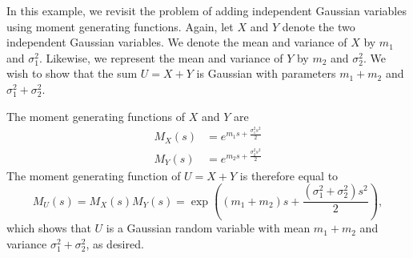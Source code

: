 \begin{example}
In this example, we revisit the problem of adding independent Gaussian variables using moment generating functions.
Again, let $X$ and $Y$ denote the two independent Gaussian variables.
We denote the mean and variance of $X$ by $m_1$ and $\sigma_1^2$.
Likewise, we represent the mean and variance of $Y$ by $m_2$ and $\sigma_2^2$.
We wish to show that the sum $U = X + Y$ is Gaussian with parameters $m_1 + m_2$ and $\sigma_1^2 + \sigma_2^2$.

The moment generating functions of $X$ and $Y$ are
\begin{align*}
M_X (s) &= e^{m_1 s + \frac{\sigma_1^2 s^2}{2}} \\
M_Y (s) &= e^{m_2 s + \frac{\sigma_2^2 s^2}{2}}
\end{align*}
The moment generating function of $U = X + Y$ is therefore equal to
\begin{equation*}
M_U (s) = M_X (s) M_Y (s)
= \exp \left( (m_1 + m_2) s + \frac{(\sigma_1^2 + \sigma_2^2) s^2}{2} \right) ,
\end{equation*}
which shows that $U$ is a Gaussian random variable with mean $m_1 + m_2$ and variance $\sigma_1^2 + \sigma_2^2$, as desired.
\end{example}

